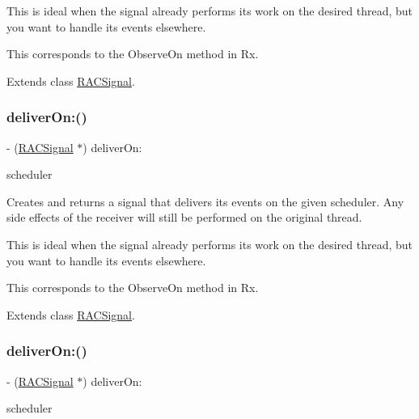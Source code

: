 This is ideal when the signal already performs its work on the desired thread, but you want to handle its events elsewhere.

This corresponds to the {\ttfamily Observe\+On} method in Rx. 

Extends class \mbox{\hyperlink{interface_r_a_c_signal_a69e4dc1c476da42ed829caed84fbd258}{R\+A\+C\+Signal}}.

\mbox{\label{category_r_a_c_signal_07_operations_08_a69e4dc1c476da42ed829caed84fbd258}} 
\subsubsection{\texorpdfstring{deliver\+On\+:()}{deliverOn:()}\hspace{0.1cm}{\footnotesize\ttfamily [2/3]}}
{\footnotesize\ttfamily -\/ (\mbox{\hyperlink{interface_r_a_c_signal}{R\+A\+C\+Signal}} $\ast$) deliver\+On\+: \begin{DoxyParamCaption}\item[{(\mbox{\hyperlink{interface_r_a_c_scheduler}{R\+A\+C\+Scheduler}} $\ast$)}]{scheduler }\end{DoxyParamCaption}}

Creates and returns a signal that delivers its events on the given scheduler. Any side effects of the receiver will still be performed on the original thread.

This is ideal when the signal already performs its work on the desired thread, but you want to handle its events elsewhere.

This corresponds to the {\ttfamily Observe\+On} method in Rx. 

Extends class \mbox{\hyperlink{interface_r_a_c_signal_a69e4dc1c476da42ed829caed84fbd258}{R\+A\+C\+Signal}}.

\mbox{\label{category_r_a_c_signal_07_operations_08_a69e4dc1c476da42ed829caed84fbd258}} 
\subsubsection{\texorpdfstring{deliver\+On\+:()}{deliverOn:()}\hspace{0.1cm}{\footnotesize\ttfamily [3/3]}}
{\footnotesize\ttfamily -\/ (\mbox{\hyperlink{interface_r_a_c_signal}{R\+A\+C\+Signal}} $\ast$) deliver\+On\+: \begin{DoxyParamCaption}\item[{(\mbox{\hyperlink{interface_r_a_c_scheduler}{R\+A\+C\+Scheduler}} $\ast$)}]{scheduler }\end{DoxyParamCaption}}

